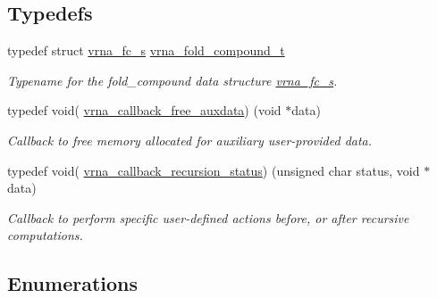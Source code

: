 \subsection*{Typedefs}
\begin{DoxyCompactItemize}
\item 
typedef struct \hyperlink{group__fold__compound_structvrna__fc__s}{vrna\+\_\+fc\+\_\+s} \hyperlink{group__fold__compound_ga1b0cef17fd40466cef5968eaeeff6166}{vrna\+\_\+fold\+\_\+compound\+\_\+t}\hypertarget{group__fold__compound_ga1b0cef17fd40466cef5968eaeeff6166}{}\label{group__fold__compound_ga1b0cef17fd40466cef5968eaeeff6166}

\begin{DoxyCompactList}\small\item\em Typename for the fold\+\_\+compound data structure \hyperlink{group__fold__compound_structvrna__fc__s}{vrna\+\_\+fc\+\_\+s}. \end{DoxyCompactList}\item 
typedef void( \hyperlink{group__fold__compound_ga3ae51bfd5fc3236652d1de4e3274b49b}{vrna\+\_\+callback\+\_\+free\+\_\+auxdata}) (void $\ast$data)
\begin{DoxyCompactList}\small\item\em Callback to free memory allocated for auxiliary user-\/provided data. \end{DoxyCompactList}\item 
typedef void( \hyperlink{group__fold__compound_ga4a4a0d838de6d18315bafc84f93f5cc0}{vrna\+\_\+callback\+\_\+recursion\+\_\+status}) (unsigned char status, void $\ast$data)
\begin{DoxyCompactList}\small\item\em Callback to perform specific user-\/defined actions before, or after recursive computations. \end{DoxyCompactList}\end{DoxyCompactItemize}
\subsection*{Enumerations}

